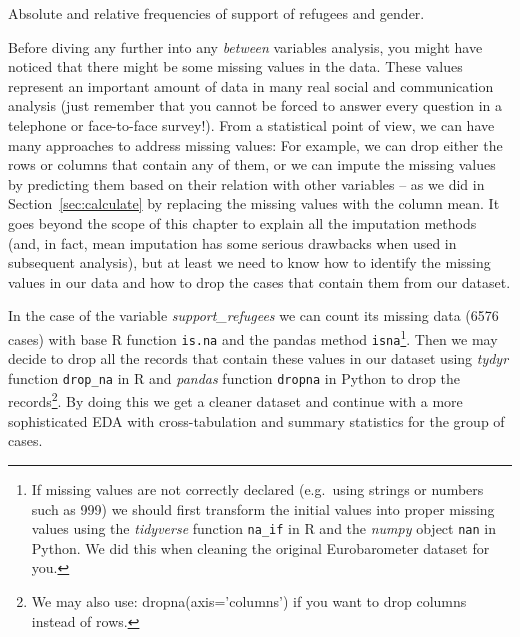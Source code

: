 \begin{ccsexample}
\caption{Absolute and relative frequencies of support of refugees and gender.}\label{ex:frequency2}
\end{ccsexample}


Before diving any further into any \textit{between} variables analysis, you might have noticed that there might be some missing values in the data. These values represent an important amount of data in many real social and communication analysis (just remember that you cannot be forced to answer  every question in a telephone or face-to-face survey!). From a statistical point of view, we can have many approaches to address missing values: For example, we can drop either the rows or columns that contain any of them, or we can impute the missing values by predicting them based on their relation with other variables -- as we did in Section~\ref{sec:calculate} by replacing the missing values with the column mean. It goes beyond the scope of this chapter to explain all the imputation methods (and, in fact, mean imputation has some serious drawbacks when used in subsequent analysis), but at least we need to know how to identify the missing values in our data and how to drop the cases that contain them from our dataset.

In the case of the variable \textit{support\_refugees} we can count its missing data (6576 cases) with base R function \texttt{is.na} and the pandas method \texttt{isna}\footnote{If missing values are not correctly declared (e.g.\ using strings or numbers such as 999) we should first transform the initial values into proper missing values using the \emph{tidyverse} function \texttt{na\_if} in R and the \emph{numpy} object \texttt{nan} in Python. We  did this when cleaning the original Eurobarometer dataset for you.}.  Then we may decide to drop all the records that contain these values in our dataset using \emph{tydyr} function \texttt{drop\_na} in R and \emph{pandas} function \texttt{dropna} in Python to drop the records\footnote{We may also use: dropna(axis='columns') if you want to drop columns instead of rows.}. By doing this we get a cleaner dataset and continue with a more sophisticated EDA with cross-tabulation and summary statistics for the group of cases.	

